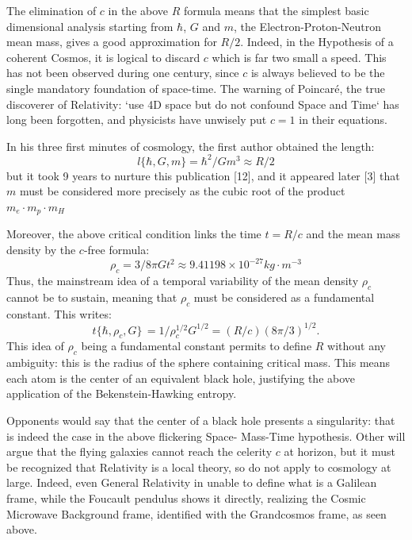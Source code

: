 \documentclass[twoside,draft]{article}
\begin{document}
\begin{sloppypar}
{The elimination of $c$ in the above $R$ formula means that the simplest basic dimensional
analysis starting from $\hbar$, $G$ and $m$, the Electron-Proton-Neutron mean mass, gives a good
approximation for $R/2$. Indeed, in the Hypothesis of a coherent Cosmos, it is logical to discard $c$
which is far two small a speed. This has not been observed during one century, since $c$ is always
believed to be the single mandatory foundation of space-time. The warning of Poincar\'{e}, the true
discoverer of Relativity: `use 4D space but do not confound Space and Time` has long been
forgotten, and physicists have unwisely put $c = 1$ in their equations.

In his three first minutes of cosmology, the first author obtained the length:
\begin{equation}
l \{\hbar,G,m\} = \hbar^{2} /Gm^{3} \approx R/2
\end{equation}
but it took 9 years to nurture this publication [12], and it appeared later [3] that $m$ must be considered more precisely as the cubic root of the product 
$
m_{e} \cdot m_{p} \cdot m_{H}$

Moreover, the above critical condition
links the time $t = R/c$ and the mean mass density by the $c$-free formula:
\begin{equation}
\rho_{c} = 3/8\pi Gt^{2} \approx 9.41198 \times 10^{-27} kg \cdot m^{-3}
\end{equation}
Thus, the mainstream idea of a temporal variability of the mean density $\rho_{c}$ cannot be to
sustain, meaning that $\rho_{c}$ must be considered as a fundamental constant. This writes:
\begin{equation}
t\{\hbar,\rho_{c} ,G\}\, = 1/\rho_{c}^{1/2} G^{1/2} = (R/c) (8\pi/3)^{1/2}.
\end{equation}
This idea of $\rho_{c}$ being a fundamental constant permits to define $R$ without any ambiguity: this is the 
radius of the sphere containing critical mass. This means each atom is the center of an equivalent black hole,
justifying the above application of the Bekenstein-Hawking entropy. 

Opponents would say that the
center of a black hole presents a singularity: that is indeed the case in the above flickering Space-
Mass-Time hypothesis. Other will argue that the flying galaxies cannot reach the celerity $c$ at
horizon, but it must be recognized that Relativity is a local theory, so do not apply to cosmology at large.
Indeed, even General Relativity in unable to define what is a Galilean frame, while the Foucault
pendulus shows it directly, realizing the Cosmic Microwave Background frame, identified with the
Grandcosmos frame, as seen above.

}
\end{sloppypar}
\end{document}
